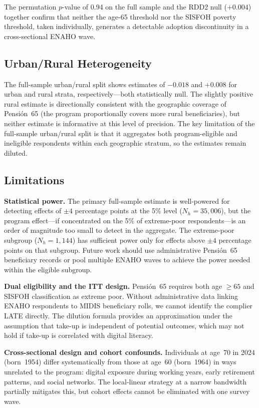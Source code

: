 \documentclass[12pt]{article}
\begin{document}
The permutation $p$-value of 0.94 on the full sample and the RDD2 null
($+0.004$) together confirm that neither the age-65 threshold nor the
SISFOH poverty threshold, taken individually, generates a detectable
adoption discontinuity in a cross-sectional ENAHO wave.

\subsection{Urban/Rural Heterogeneity}

The full-sample urban/rural split shows estimates of $-0.018$ and $+0.008$
for urban and rural strata, respectively---both statistically null.
The slightly positive rural estimate is directionally consistent with the
geographic coverage of Pensi\'on~65 (the program proportionally covers more
rural beneficiaries), but neither estimate is informative at this level of
precision. The key limitation of the full-sample urban/rural split is that
it aggregates both program-eligible and ineligible respondents within each
geographic stratum, so the estimates remain diluted.

\subsection{Limitations}

\textbf{Statistical power.}
The primary full-sample estimate is well-powered for detecting
effects of $\pm 4$ percentage points at the 5\% level ($N_h\!=\!35{,}006$),
but the program effect---if concentrated on the 5\% of extreme-poor
respondents---is an order of magnitude too small to detect in the aggregate.
The extreme-poor subgroup ($N_h\!=\!1{,}144$) has sufficient power only for
effects above $\pm 4$ percentage points on that subgroup. Future work should
use administrative Pensi\'on~65 beneficiary records or pool multiple ENAHO
waves to achieve the power needed within the eligible subgroup.

\textbf{Dual eligibility and the ITT design.}
Pensi\'on~65 requires both age $\ge 65$ and SISFOH classification as extreme
poor. Without administrative data linking ENAHO respondents to MIDIS
beneficiary rolls, we cannot identify the complier LATE directly. The
dilution formula provides an approximation under the assumption that take-up
is independent of potential outcomes, which may not hold if take-up is
correlated with digital literacy.

\textbf{Cross-sectional design and cohort confounds.}
Individuals at age~70 in 2024 (born~1954) differ systematically from those
at age~60 (born~1964) in ways unrelated to the program: digital exposure
during working years, early retirement patterns, and social networks.
The local-linear strategy at a narrow bandwidth partially mitigates this,
but cohort effects cannot be eliminated with one survey wave.
\end{document}
